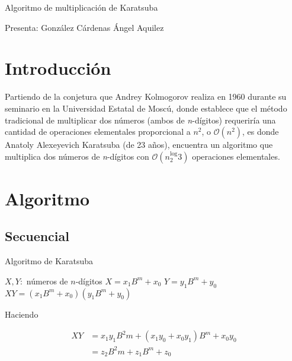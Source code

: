 \documentclass[a4paper,12pt]{article}
\begin{document}
\vspace{2cm}

\Huge{Algoritmo de multiplicación de Karatsuba}

\vspace{1cm}

\large{Presenta: González Cárdenas Ángel Aquilez}

\vspace{1cm}

\section{Introducción}

Partiendo de la conjetura que Andrey Kolmogorov realiza en 1960 durante su seminario en la Universidad Estatal de Moscú, donde establece que el método tradicional de multiplicar dos números (ambos de \textit{n}-dígitos) requeriría una cantidad de operaciones elementales proporcional a $n^2$, o $\mathcal{O}(n^2)$, es donde Anatoly Alexeyevich Karatsuba (de 23 años), encuentra un algoritmo que multiplica dos números de \textit{n}-dígitos con $\mathcal{O}(n^\log_2{3})$ operaciones elementales.\par

\section{Algoritmo}

\subsection{Secuencial}

\vspace{1cm}

\begin{algorithm}
\caption{Algoritmo de Karatsuba}
\begin{algorithmic}[1]

 \Comment $X,Y:$ números de $n$-dígitos
	\State $X = x_1 B^m + x_0$
	\State $Y = y_1 B^m + y_0$
	\State $XY = (x_1 B^m + x_0)(y_1 B^m+y_0)$

\end{algorithmic}
\end{algorithm}

\vspace{1cm}

Haciendo

\begin{align*}
XY &= x_1 y_1 B^2m + (x_1 y_0 + x_0 y_1)B^m + x_0 y_0 \\
&= z_2 B^2m + z_1 B^m + z_0
\end{align*}
\end{document}
